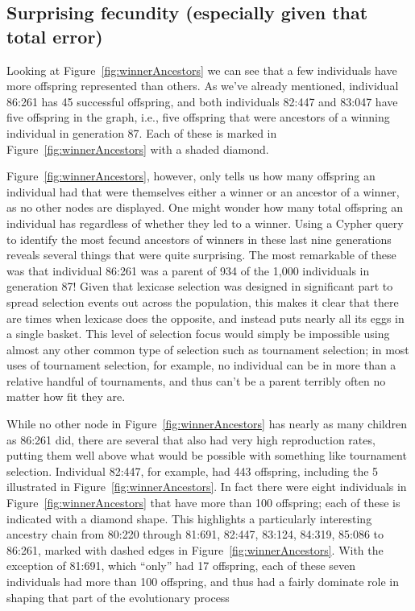 \subsection{Surprising fecundity (especially given that total error)}
\label{sec:surprisingFecundity}

Looking at Figure~\ref{fig:winnerAncestors} we can see that a few individuals have more offspring
represented than others. As we've already mentioned, individual 86:261 has 45 successful offspring,
and both individuals 82:447 and 83:047 have five offspring in the graph, i.e., five offspring that were
ancestors of a winning individual in generation 87. Each of these is marked in 
Figure~\ref{fig:winnerAncestors} with a shaded diamond.

Figure~\ref{fig:winnerAncestors},
however, only tells us how many offspring an individual had that were themselves either a winner
or an ancestor of a winner, as no other nodes are displayed. One
might wonder how many total offspring an individual has
regardless of whether they led to a winner. Using a Cypher query to identify the most
fecund ancestors of winners in these last nine generations reveals several things that were
quite surprising. The most remarkable of these was that individual 86:261 
was a parent of 934 of the 1,000 individuals in generation 87! Given that lexicase selection was
designed in significant part to spread selection events out across the population, this makes it
clear that there are times when lexicase does the opposite, and instead puts nearly all its eggs in
a single basket. This level of selection focus would simply be impossible using almost any other
common type of selection such as tournament selection; in most uses of tournament selection, 
for example, no individual can be in more than a relative handful of tournaments, and thus can't be
a parent terribly often no matter how fit they are.

While no other node in Figure~\ref{fig:winnerAncestors} has nearly as many children as 86:261 did,
there are several that also had very high reproduction rates, putting them well above what would be 
possible with something like tournament selection. Individual 82:447, for example, had
443 offspring, including the 5 illustrated in Figure~\ref{fig:winnerAncestors}. In fact there were
eight individuals in Figure~\ref{fig:winnerAncestors} that have more than 100 offspring; each of
these is indicated with a diamond shape. This highlights a particularly
interesting ancestry chain from 80:220 through 81:691, 82:447, 83:124, 84:319, 85:086 to 86:261, marked with
dashed edges in Figure~\ref{fig:winnerAncestors}. With the exception of 81:691, which ``only'' had 17
offspring, each of these seven individuals had more
than 100 offspring, and thus had a fairly dominate role in shaping that part of the evolutionary process

